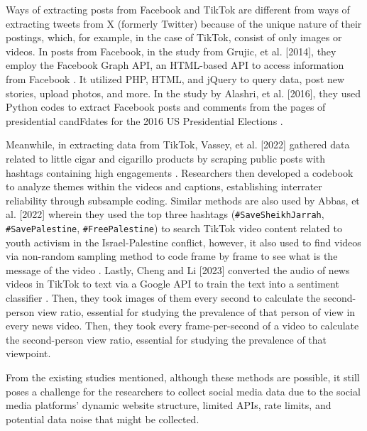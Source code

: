Ways of extracting posts from Facebook and TikTok are different from ways of extracting tweets from X (formerly Twitter) because of the unique nature of their postings, which, for example, in the case of TikTok, consist of only images or videos. In posts from Facebook, in the study from Grujic, et al. [2014], they employ the Facebook Graph API, an HTML-based API to access information from Facebook \cite{RRL_Grujic-2014}. It utilized PHP, HTML, and jQuery to query data, post new stories, upload photos, and more. In the study by Alashri, et al. [2016], they used Python codes to extract Facebook posts and comments from the pages of presidential candFdates for the 2016 US Presidential Elections \cite{RRL_Alashri-2016}.

Meanwhile, in extracting data from TikTok, Vassey, et al. [2022] gathered data related to little cigar and cigarillo products by scraping public posts with hashtags containing high engagements \cite{RRL_Vassey-2022}. Researchers then developed a codebook to analyze themes within the videos and captions, establishing interrater reliability through subsample coding. Similar methods are also used by Abbas, et al. [2022] wherein they used the top three hashtags (\texttt{\#SaveSheikhJarrah}, \texttt{\#SavePalestine}, \texttt{\#FreePalestine}) to search TikTok video content related to youth activism in the Israel-Palestine conflict, however, it also used to find videos via non-random sampling method to code frame by frame to see what is the message of the video \cite{RRL_Abbas-2022}. Lastly, Cheng and Li [2023] converted the audio of news videos in TikTok to text via a Google API to train the text into a sentiment classifier \cite{RRL_Cheng-2024}. Then, they took images of them every second to calculate the second-person view ratio, essential for studying the prevalence of that person of view in every news video. Then, they took every frame-per-second of a video to calculate the second-person view ratio, essential for studying the prevalence of that viewpoint.

From the existing studies mentioned, although these methods are possible, it still poses a challenge for the researchers to collect social media data due to the social media platforms’ dynamic website structure, limited APIs, rate limits, and potential data noise that might be collected.